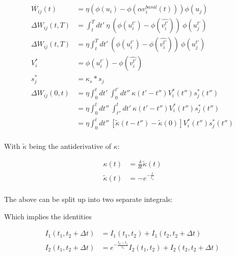 \begin{align}
  \dot{W_{ij}}(t)    & = \eta (\phi(u_i) - \phi(\alpha v^{basal}_i(t))) \phi(u_j)                                                     \\
  \Delta W_{ij}(t,T) & = \int_t^T dt' \ \eta \  (\phi(u_i^{t'}) - \phi(\widehat{v_i^{t'}})) \  \phi(u_j^{t'})                         \\
  \Delta W_{ij}(t,T) & = \eta \int_t^T dt' \  (\phi(u_i^{t'}) - \phi(\widehat{v_i^{t'}})) \ \phi(u_j^{t'})                            \\
  V_i^*              & = \phi(u_i^{t'}) - \phi(\widehat{v_i^{t'}})                                                                    \\
  s_j^*              & = \kappa_s * s_j                                                                                               \\
  \Delta W_{ij}(0,t) & =\eta \int_0^t dt' \  \int_0^{t'} dt'' \ \kappa(t'-t'') V_i^\ast (t'') s_j^\ast (t'')                          \\
                     & = \eta \int_0^t dt'' \  \int_{t''}^{t} dt' \ \kappa(t'-t'') V_i^\ast (t'') s_j^\ast (t'')                      \\
                     & = \eta \int_0^t dt'' \  \left[ \tilde{\kappa}(t-t'') - \tilde{\kappa}(0) \right] V_i^\ast (t'') s_j^\ast (t'') \\
\end{align}

With $\tilde{\kappa}$ being the antiderivative of $\kappa$:

\begin{align}
  \kappa(t)         & = \frac{\delta}{\delta t} \tilde{\kappa}(t) \\
  \tilde{\kappa}(t) & = - e^{-\frac{t}{t_{\kappa}}}               \\
\end{align}

The above can be split up into two separate integrals:

Which implies the identities

\begin{align}
  I_1(t_1, t_2 + \Delta t) & = I_1 (t_1, t_2) + I_1 (t_2, t_2 + \Delta t)                                       \\
  I_2(t_1, t_2 + \Delta t) & = e^{- \frac{t_2 - t_1}{\tau_{\kappa}}} I_2 (t_1, t_2) + I_2 (t_2, t_2 + \Delta t)
\end{align}


